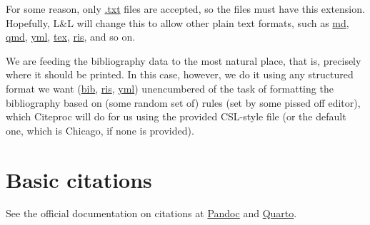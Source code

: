 \documentclass[
  12pt,
  a4paper,
  oneside,
  numbers=noenddot,
  titlepage,
  toclink=all,
  toc=bibliography]{scrbook}
\theoremstyle{definition}
\theoremstyle{definition}
\theoremstyle{definition}
\theoremstyle{plain}
\theoremstyle{plain}
\theoremstyle{plain}
\theoremstyle{plain}
\theoremstyle{plain}
\theoremstyle{remark}
\begin{document}
\begin{tcolorbox}[enhanced jigsaw, arc=.35mm, left=2mm, colframe=quarto-callout-warning-color-frame, bottomrule=.15mm, toprule=.15mm, colback=white, breakable, opacityback=0, rightrule=.15mm, leftrule=.75mm]
\begin{minipage}[t]{5.5mm}
\textcolor{quarto-callout-warning-color}{\faExclamationTriangle}
\end{minipage}%
\begin{minipage}[t]{\textwidth - 5.5mm}

For some reason, only \ul{.txt} files are accepted, so the files must
have this extension. Hopefully, L\&L will change this to allow other
plain text formats, such as \ul{md}, \ul{qmd}, \ul{yml}, \ul{tex},
\ul{ris}, and so on.

\end{minipage}%
\end{tcolorbox}

\begin{tcolorbox}[enhanced jigsaw, titlerule=0mm, left=2mm, toptitle=1mm, colback=white, coltitle=black, rightrule=.15mm, arc=.35mm, title=\textcolor{quarto-callout-note-color}{\faInfo}\hspace{0.5em}{From lists of names to the formatted bibliography}, colframe=quarto-callout-note-color-frame, bottomrule=.15mm, colbacktitle=quarto-callout-note-color!10!white, toprule=.15mm, breakable, bottomtitle=1mm, opacityback=0, opacitybacktitle=0.6, leftrule=.75mm]

We are feeding the bibliography data to the most natural place, that is,
precisely where it should be printed. In this case, however, we do it
using any structured format we want (\ul{bib}, \ul{ris}, \ul{yml})
unencumbered of the task of formatting the bibliography based on (some
random set of) rules (set by some pissed off editor), which Citeproc
will do for us using the provided CSL-style file (or the default one,
which is Chicago, if none is provided).

\end{tcolorbox}

\hypertarget{sec-scriv43}{%
\section{Basic citations}\label{sec-scriv43}}

\begin{tcolorbox}[enhanced jigsaw, titlerule=0mm, left=2mm, toptitle=1mm, colback=white, coltitle=black, rightrule=.15mm, arc=.35mm, title=\textcolor{quarto-callout-note-color}{\faInfo}\hspace{0.5em}{Official documentation}, colframe=quarto-callout-note-color-frame, bottomrule=.15mm, colbacktitle=quarto-callout-note-color!10!white, toprule=.15mm, breakable, bottomtitle=1mm, opacityback=0, opacitybacktitle=0.6, leftrule=.75mm]

See the official documentation on citations at
\href{pandoc.org/MANUAL.html\#citations}{Pandoc} and
\href{quarto.org/docs/authoring/footnotes-and-citations.html\#sec-citations}{Quarto}.

\end{tcolorbox}
\end{document}
